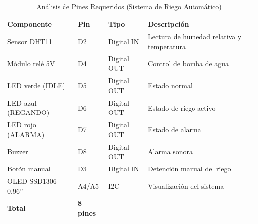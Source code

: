 \begin{table}[ht]
\caption{Análisis de Pines Requeridos (Sistema de Riego Automático)}
\label{tab:Tabla_2_R3}
\centering
\renewcommand{\arraystretch}{1.3}
\begin{tabularx}{\columnwidth}{p{2.2cm} p{1.0cm} p{1.5cm} X}
\toprule
\textbf{Componente} & \textbf{Pin} & \textbf{Tipo} & \textbf{Descripción} \\
\midrule
Sensor DHT11        & D2    & Digital IN  & Lectura de humedad relativa y temperatura \\
Módulo relé 5V      & D4    & Digital OUT & Control de bomba de agua \\
LED verde (IDLE)    & D5    & Digital OUT & Estado normal \\
LED azul (REGANDO)  & D6    & Digital OUT & Estado de riego activo \\
LED rojo (ALARMA)   & D7    & Digital OUT & Estado de alarma \\
Buzzer              & D8    & Digital OUT & Alarma sonora \\
Botón manual        & D3    & Digital IN  & Detención manual del riego \\
OLED SSD1306 0.96'' & A4/A5 & I2C         & Visualización del sistema \\
\midrule
\textbf{Total} & \textbf{8 pines} & --- & --- \\
\bottomrule
\end{tabularx}
\end{table}